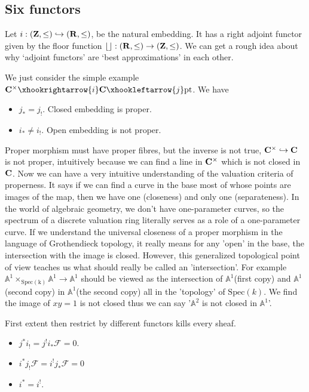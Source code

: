\documentclass[../main.tex]{subfiles}
\begin{document}
\subsection{Six functors}
\begin{example}
Let $i:(\mathbf{Z}, \leq)\hookrightarrow (\mathbf{R}, \leq)$, be the natural embedding. It has a right adjoint functor given by the floor function $\lfloor \rfloor:(\mathbf{R}, \leq)\rightarrow (\mathbf{Z}, \leq)$. We can get a rough idea about why `adjoint functors' are `best approximations' in each other. 
\end{example}
\begin{example}[$i_{*},i^{*}, i_{!}, i^{!}, j_{*},j^{*}, j_{!}, j^{!}$]
We just consider the simple example $\C^{\times}\xhookrightarrow{i}\C\xhookleftarrow{j} \mathrm{pt}$. We have 
\begin{itemize}
    \item $j_{*}=j_{!}$. Closed embedding is proper.
    \item $i_{*}\neq i_{!}$. Open embedding is not proper.
\end{itemize}
Proper morphism must have proper fibres, but the inverse is not true, $\mathbf{C}^{\times}\hookrightarrow \mathbf{C}$ is not proper, intuitively because we can find a line in $\mathbf{C}^{\times}$ which is not closed in $\mathbf{C}$. Now we can have a very intuitive understanding of the valuation criteria of properness. It says if we can find a curve in the base most of whose points are images of the map, then we have one (closeness) and only one (separateness). In the world of algebraic geometry, we don't have one-parameter curves, so the spectrum of a discrete valuation ring literally serves as a role of a one-parameter curve. If we understand the universal closeness of a proper morphism in the language of Grothendieck topology, it really means for any 'open' in the base, the intersection with the image is closed. However, this generalized topological point of view teaches us what should really be called an 'intersection'. For example $\mathbb{A}^{1}\times_{\mathrm{Spec(k)}} \mathbb{A}^{1} \rightarrow \mathbb{A}^{1}$ should be viewed as the intersection of $\mathbb{A}^{1}$(first copy) and $\mathbb{A}^{1}$(second copy) in $\mathbb{A}^{1}$(the second copy) all in the 'topology' of $\mathrm{Spec}(k)$. We find the image of $xy=1$ is not closed thus we can say '$\mathbb{A}^{2}$ is not closed in $\mathbb{A}^{1}$'. 

First extent then restrict by different functors kills every sheaf.
\begin{itemize}
    \item $j^{*}i_{!}=j^{!}i_{*}\mathscr{F}=0$.
    \item $i^{*}j_{!}\mathscr{F}=i^{!}j_{*}\mathscr{F}=0$
\end{itemize}

\begin{itemize}
    \item $i^{*}=i^{!}$.
\end{itemize}




\end{example}
\end{document}
